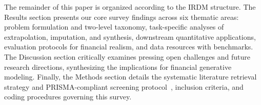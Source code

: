 The remainder of this paper is organized according to the IRDM structure. The Results section presents our core survey findings across six thematic areas: problem formulation and two-level taxonomy, task-specific analyses of extrapolation, imputation, and synthesis, downstream quantitative applications, evaluation protocols for financial realism, and data resources with benchmarks. The Discussion section critically examines pressing open challenges and future research directions, synthesizing the implications for financial generative modeling. Finally, the Methods section details the systematic literature retrieval strategy and PRISMA-compliant screening protocol~\citep{page2021prisma}, inclusion criteria, and coding procedures governing this survey.